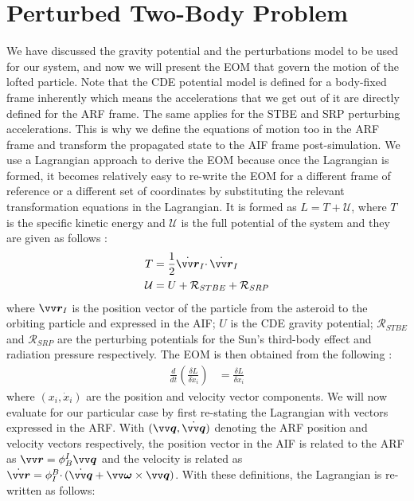\section{Perturbed Two-Body Problem}
\label{sec:2BP}
We have discussed the gravity potential and the perturbations model to be used for our system, and now we will present the \gls{EOM} that govern the motion of the lofted particle. Note that the \gls{CDE} potential model is defined for a body-fixed frame inherently which means the accelerations that we get out of it are directly defined for the \gls{ARF} frame. The same applies for the \gls{STBE} and \gls{SRP} perturbing accelerations. This is why we define the equations of motion too in the \gls{ARF} frame and transform the propagated state to the \gls{AIF} frame post-simulation.
%
\newline\newline
%
We use a Lagrangian approach to derive the \gls{EOM} because once the Lagrangian is formed, it becomes relatively easy to re-write the \gls{EOM} for a different frame of reference or a different set of coordinates by substituting the relevant transformation equations in the Lagrangian. It is formed as $L=T+\mathcal{U}$, where $T$ is the specific kinetic energy and $\mathcal{U}$ is the full potential of the system and they are given as follows \parencite{scheeresBook}:
\begin{align}
    T &= \frac{1}{2} \dot{\bv{r}}_I \cdotp \dot{\bv{r}}_I
    \label{eqn:lagrangian_kinetic_energy} \\
    \mathcal{U} &= U + \mathcal{R}_{STBE} + \mathcal{R}_{SRP}
    \label{lagrangian_potential}
\end{align}
where $\bv{r}_I$ is the position vector of the particle from the asteroid to the orbiting particle and expressed in the \gls{AIF}; $U$ is the \gls{CDE} gravity potential; $\mathcal{R}_{STBE}$ and $\mathcal{R}_{SRP}$ are the perturbing potentials for the Sun's third-body effect and radiation pressure respectively. The \gls{EOM} is then obtained from the following \parencite{scheeresBook}:
\begin{align}
    \frac{d}{dt} \left(\frac{\delta L}{\delta \dot{x}_i}\right) &= \frac{\delta L}{\delta x_i}
    \label{eqn:lagrange_general_form}
\end{align}
where $(x_i, \dot{x}_i)$ are the position and velocity vector components. We will now evaluate  for our particular case by first re-stating the Lagrangian with vectors expressed in the \gls{ARF}. With $(\bv{q}, \dot{\bv{q}})$ denoting the \gls{ARF} position and velocity vectors respectively, the position vector in the \gls{AIF} is related to the \gls{ARF} as $\bv{r} = \phi_B^I \bv{q}$ and the velocity is related as $\dot{\bv{r}} = \phi_I^B \cdotp (\dot{\bv{q}} + \bv{\omega} \times \bv{q})$. With these definitions, the Lagrangian is re-written as follows:
